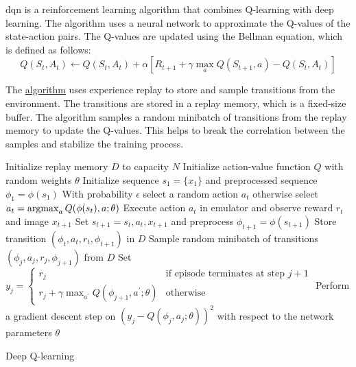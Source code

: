 \gls{dqn} is a reinforcement learning algorithm that combines Q-learning
with deep learning. The algorithm uses a neural network to approximate the
Q-values of the state-action pairs. The Q-values are updated using the Bellman
equation, which is defined as follows:
\begin{equation}
    Q(S_t, A_t) \leftarrow Q(S_t, A_t) + \alpha [R_{t+1} + \gamma \max_{a} Q(S_{t+1}, a) - Q(S_t, A_t)]
\end{equation}

The \hyperref[alg:dqn]{algorithm} uses experience replay to store and sample
transitions from the environment. The transitions are stored in a replay
memory, which is a fixed-size buffer. The algorithm samples a random minibatch
of transitions from the replay memory to update the Q-values. This helps to
break the correlation between the samples and stabilize the training process.

\begin{algorithm}[H]
    \begin{algorithmic}[1]
        \State Initialize replay memory $D$ to capacity $N$
        \State Initialize action-value function $Q$ with random weights $\theta$
            \State Initialize sequence $s_1 = \{x_1\}$ and preprocessed sequence $\phi_1 = \phi(s_1)$
                \State With probability $\epsilon$ select a random action $a_t$
                \State otherwise select $a_t = \operatorname{argmax}_a Q(\phi(s_t), a; \theta)$
                \State Execute action $a_t$ in emulator and observe reward $r_t$ and image $x_{t+1}$
                \State Set $s_{t+1} = s_t, a_t, x_{t+1}$ and preprocess $\phi_{t+1} = \phi(s_{t+1})$
                \State Store transition $(\phi_t, a_t, r_t, \phi_{t+1})$ in $D$
                \State Sample random minibatch of transitions $(\phi_j, a_j, r_j, \phi_{j+1})$ from $D$
                \State Set $y_j = \begin{cases}
                    r_j & \text{if episode terminates at step } j+1 \\
                    r_j + \gamma \max_{a^\prime} Q(\phi_{j+1}, a^\prime; \theta) & \text{otherwise}
                \end{cases}$
                \State Perform a gradient descent step on $(y_j - Q(\phi_j, a_j; \theta))^2$ with respect to the network parameters $\theta$
            \EndFor
        \EndFor
    \end{algorithmic}
    \caption{Deep Q-learning}
    \label{alg:dqn}
\end{algorithm}

